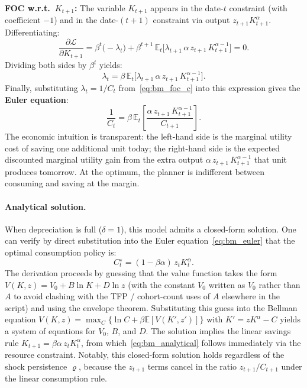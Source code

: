 \documentclass[11pt,a4paper]{report}
\newcommand{\E}[1]{\mathbb{E}\!\left[#1\right]}
\newcommand{\emphc}[1]{\textcolor{harvardcrimson}{\textbf{#1}}}
\begin{document}
\noindent\textbf{FOC w.r.t.\ $K_{t+1}$:}\; The variable $K_{t+1}$ appears in the date-$t$ constraint (with coefficient $-1$) and in the date-$(t\!+\!1)$ constraint via output $z_{t+1}K_{t+1}^\alpha$.  Differentiating:
\begin{equation}
\frac{\partial \mathcal{L}}{\partial K_{t+1}}
= \beta^t\bigl(-\lambda_t\bigr) + \beta^{t+1}\,\mathbb{E}_t\!\bigl[\lambda_{t+1}\,\alpha\, z_{t+1}\, K_{t+1}^{\alpha-1}\bigr] = 0.
\label{eq:bm_foc_k}
\end{equation}
Dividing both sides by $\beta^t$ yields:
\begin{equation}
\lambda_t = \beta\,\mathbb{E}_t\!\bigl[\lambda_{t+1}\,\alpha\, z_{t+1}\, K_{t+1}^{\alpha-1}\bigr].
\end{equation}
Finally, substituting $\lambda_t = 1/C_t$ from~\eqref{eq:bm_foc_c} into this expression gives the \emphc{Euler equation}:
\begin{equation}
\frac{1}{C_t}
= \beta\,\mathbb{E}_t\!\left[
\frac{\alpha\, z_{t+1}\, K_{t+1}^{\alpha-1}}{C_{t+1}}
\right].
\label{eq:bm_euler}
\end{equation}
The economic intuition is transparent: the left-hand side is the marginal utility cost of saving one additional unit today; the right-hand side is the expected discounted marginal utility gain from the extra output $\alpha\, z_{t+1}\, K_{t+1}^{\alpha-1}$ that unit produces tomorrow.  At the optimum, the planner is indifferent between consuming and saving at the margin.

\paragraph{Analytical solution.}  When depreciation is full ($\delta = 1$), this model admits a closed-form solution.  One can verify by direct substitution into the Euler equation~\eqref{eq:bm_euler} that the optimal consumption policy is:
\begin{equation}
C_t^\star = (1 - \beta\alpha)\, z_t K_t^\alpha.
\label{eq:bm_analytical}
\end{equation}
The derivation proceeds by guessing that the value function takes the form $V(K,z) = V_0 + B\ln K + D\ln z$ (with the constant $V_0$ written as $V_0$ rather than $A$ to avoid clashing with the TFP / cohort-count uses of $A$ elsewhere in the script) and using the envelope theorem.  Substituting this guess into the Bellman equation $V(K,z) = \max_C \{\ln C + \beta \E{V(K',z')}\}$ with $K' = zK^\alpha - C$ yields a system of equations for $V_0$, $B$, and $D$.  The solution implies the linear savings rule $K_{t+1} = \beta\alpha\, z_t K_t^\alpha$, from which~\eqref{eq:bm_analytical} follows immediately via the resource constraint.  Notably, this closed-form solution holds regardless of the shock persistence $\varrho$, because the $z_{t+1}$ terms cancel in the ratio $z_{t+1}/C_{t+1}$ under the linear consumption rule.
\end{document}
